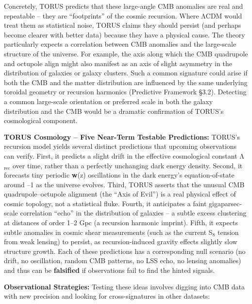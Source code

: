 \documentclass[]{article}
\newcommand{\subscript}[1]{\ensuremath{_{\mathrm{#1}}}}
\begin{document}
Concretely, TORUS predicts that these large-angle CMB anomalies are real
and repeatable -- they are ``footprints'' of the cosmic recursion. Where
ΛCDM would treat them as statistical noise, TORUS claims they should
persist (and perhaps become clearer with better data) because they have
a physical cause. The theory particularly expects a correlation between
CMB anomalies and the large-scale structure of the universe. For
example, the axis along which the CMB quadrupole and octupole align
might also manifest as an axis of slight asymmetry in the distribution
of galaxies or galaxy clusters. Such a common signature could arise if
both the CMB and the matter distribution are influenced by the same
underlying toroidal geometry or recursion harmonics (Predictive
Framework §3.2). Detecting a common large-scale orientation or preferred
scale in both the galaxy distribution and the CMB would be a dramatic
confirmation of TORUS's cosmological component.

\textbf{TORUS Cosmology -- Five Near-Term Testable Predictions:} TORUS's
recursion model yields several distinct predictions that upcoming
observations can verify. First, it predicts a slight drift in the
effective cosmological constant
Λ\subscript{rec} over time,
rather than a perfectly unchanging dark energy density. Second, it
forecasts tiny periodic \textbf{w}(z) oscillations in the dark energy's
equation-of-state around --1 as the universe evolves. Third, TORUS
asserts that the unusual CMB quadrupole--octupole alignment (the ``Axis
of Evil'') is a real physical effect of cosmic topology, not a
statistical fluke. Fourth, it anticipates a faint gigaparsec-scale
correlation ``echo'' in the distribution of galaxies -- a subtle excess
clustering at distances of order 1--2 Gpc (a recursion harmonic
imprint). Fifth, it expects subtle anomalies in cosmic shear
measurements (such as the current
S\subscript{8} tension from
weak lensing) to persist, as recursion-induced gravity effects slightly
slow structure growth. Each of these predictions has a corresponding
null scenario (no drift, no oscillation, random CMB patterns, no LSS
echo, no lensing anomalies) and thus can be \textbf{falsified} if
observations fail to find the hinted signals.

\textbf{Observational Strategies:} Testing these ideas involves digging
into CMB data with new precision and looking for cross-signatures in
other datasets:
\end{document}
